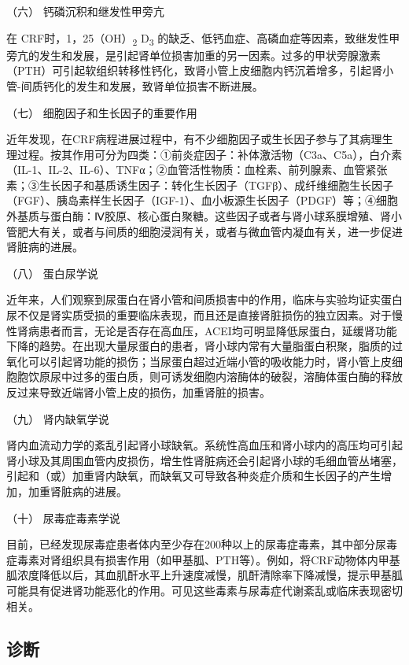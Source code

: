 \hypertarget{text00085.htmlux5cux23CHP3-8-5-2-6}{}
（六） 钙磷沉积和继发性甲旁亢

在 CRF时，1，25（OH）\textsubscript{2} D\textsubscript{3}
的缺乏、低钙血症、高磷血症等因素，致继发性甲旁亢的发生和发展，是引起肾单位损害加重的另一因素。过多的甲状旁腺激素（PTH）可引起软组织转移性钙化，致肾小管上皮细胞内钙沉着增多，引起肾小管-间质钙化的发生和发展，致肾单位损害不断进展。

\hypertarget{text00085.htmlux5cux23CHP3-8-5-2-7}{}
（七） 细胞因子和生长因子的重要作用

近年发现，在CRF病程进展过程中，有不少细胞因子或生长因子参与了其病理生理过程。按其作用可分为四类：①前炎症因子：补体激活物（C3a、C5a），白介素（IL-1、IL-2、IL-6）、TNFα；②血管活性物质：血栓素、前列腺素、血管紧张素；③生长因子和基质诱生因子：转化生长因子（TGFβ）、成纤维细胞生长因子（FGF）、胰岛素样生长因子（IGF-1）、血小板源生长因子（PDGF）等；④细胞外基质与蛋白酶：Ⅳ胶原、核心蛋白聚糖。这些因子或者与肾小球系膜增殖、肾小管肥大有关，或者与间质的细胞浸润有关，或者与微血管内凝血有关，进一步促进肾脏病的进展。

\hypertarget{text00085.htmlux5cux23CHP3-8-5-2-8}{}
（八） 蛋白尿学说

近年来，人们观察到尿蛋白在肾小管和间质损害中的作用，临床与实验均证实蛋白尿不仅是肾实质受损的重要临床表现，而且还是直接肾脏损伤的独立因素。对于慢性肾病患者而言，无论是否存在高血压，ACEI均可明显降低尿蛋白，延缓肾功能下降的趋势。在出现大量尿蛋白的患者，肾小球内常有大量脂蛋白积聚，脂质的过氧化可以引起肾功能的损伤；当尿蛋白超过近端小管的吸收能力时，肾小管上皮细胞胞饮原尿中过多的蛋白质，则可诱发细胞内溶酶体的破裂，溶酶体蛋白酶的释放反过来导致近端肾小管上皮的损伤，加重肾脏的损害。

\hypertarget{text00085.htmlux5cux23CHP3-8-5-2-9}{}
（九） 肾内缺氧学说

肾内血流动力学的紊乱引起肾小球缺氧。系统性高血压和肾小球内的高压均可引起肾小球及其周围血管内皮损伤，增生性肾脏病还会引起肾小球的毛细血管丛堵塞，引起和（或）加重肾内缺氧，而缺氧又可导致各种炎症介质和生长因子的产生增加，加重肾脏病的进展。

\hypertarget{text00085.htmlux5cux23CHP3-8-5-2-10}{}
（十） 尿毒症毒素学说

目前，已经发现尿毒症患者体内至少存在200种以上的尿毒症毒素，其中部分尿毒症毒素对肾组织具有损害作用（如甲基胍、PTH等）。例如，将CRF动物体内甲基胍浓度降低以后，其血肌酐水平上升速度减慢，肌酐清除率下降减慢，提示甲基胍可能具有促进肾功能恶化的作用。可见这些毒素与尿毒症代谢紊乱或临床表现密切相关。

\subsection{诊断}

